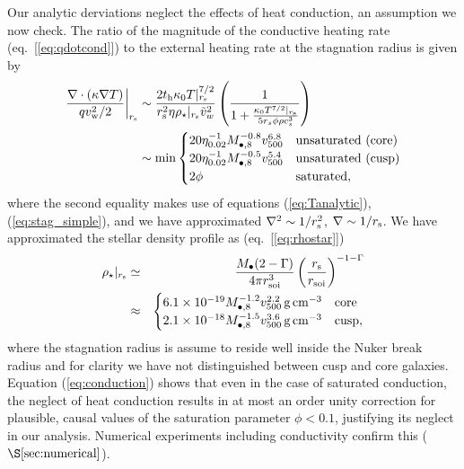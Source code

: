 \documentclass[usenatbib,fleqn]{mn2e}
\newcommand{\rs}{r_s}
\begin{document}
Our analytic derviations neglect the effects of heat conduction, an assumption we now check.  The ratio of the magnitude of the conductive heating rate (eq.~[\ref{eq:qdotcond}]) to the external heating rate at the stagnation radius is given by
\begin{align}
  \left.\frac{\nabla\cdot(\kappa \nabla T)}{q v_{\rm
w}^{2}/2}\right|_{r_{\rm s}} &\sim \frac{2t_{\rm h}\kappa_0
T|_{r_{\rm s}}^{7/2}}{r_{\rm s}^{2}\eta \rho_{\star}|_{r_{\rm s}}
\tilde{v}_{w}^{2}}
 \left(\frac{1}{1+\frac{\kappa_0 T^{7/2}|_{r_{\rm s}}}{5 \rs
    \phi \rho c_s^3}}\right)
\nonumber \\ &\sim {\rm min}
  \begin{cases}
  20 \eta_{0.02}^{-1}
M_{\bullet,8}^{-0.8} v_{500}^{6.8} &  \text{unsaturated (core)}\\
 20 \eta_{0.02}^{-1}
M_{\bullet,8}^{-0.5} v_{500}^{5.4} &  \text{unsaturated (cusp)}\\
  2 \phi & \text{saturated},
  \end{cases}
 \label{eq:conduction}
\end{align}
where the second equality makes use of equations (\ref{eq:Tanalytic}),
(\ref{eq:stag_simple}), and we have approximated $\nabla^{2} \sim
1/r_{\rm s}^{2}$, $\nabla \sim 1/r_{\rm s}$.  We have approximated the
stellar density profile as (eq.~[\ref{eq:rhostar}])
\begin{eqnarray}
  \rho_{\star}|_{r_{\rm s}} &\simeq& \frac{M_{\bullet}(2-\Gamma)}{4\pi r_{\rm soi}^{3}}\left(\frac{r_{\rm s}}{r_{\rm soi}}\right)^{-1-\Gamma} \nonumber \\
 &\approx& \begin{cases}
    6.1 \times 10^{-19}M_{\bullet,8}^{-1.2}v_{500}^{2.2}\,{\rm g\,cm^{-3}}
    & \text{core} \\
    2.1 \times 10^{-18} M_{\bullet,8}^{-1.5}v_{500}^{3.6}
    \,{\rm g\,cm^{-3}}  & \text{cusp}, 
  \end{cases}
  \label{eq:rhostarrs}
\end{eqnarray}
where the stagnation radius is assume to reside well inside the Nuker
break radius and for clarity we have not distinguished between cusp
and core galaxies.  Equation (\ref{eq:conduction}) shows that even in
the case of saturated conduction, the neglect of heat conduction
results in at most an order unity correction for plausible, causal values of
the saturation parameter $\phi < 0.1$, justifying its neglect in our
analysis.  Numerical experiments including conductivity confirm this
($\S\ref{sec:numerical}$).
\end{document}
